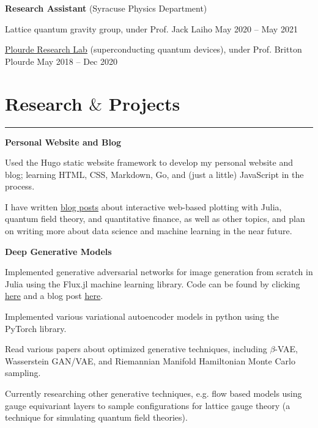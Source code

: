 \documentclass[9pt]{extarticle}
\newcommand{\myline}{\rule[\baselineskip]{\linewidth}{1pt}}
\begin{document}
\vspace{2.5pt}
\large\textbf{Research Assistant} \normalsize (Syracuse Physics Department)
\normalsize

\begin{compactitem}
\item Lattice quantum gravity group, under Prof. Jack Laiho \hfill \small May 2020 -- May 2021 
\normalsize
\item \href{https://bplourde.expressions.syr.edu/}{\underline{Plourde Research Lab}} (superconducting quantum devices), under Prof. Britton Plourde \hfill \small May 2018 -- Dec 2020
\end{compactitem}




\section{Research $\&$ Projects}

\myline

\large\textbf{Personal Website and Blog}
\normalsize

\begin{compactitem}
\item Used the Hugo static website framework to develop my personal website and blog; learning HTML, CSS, Markdown, Go, and (just a little) JavaScript in the process. 
\item I have written \href{https://aarontrowbridge.github.io/posts/}{\underline{blog posts}} about interactive web-based plotting with Julia, quantum field theory, and quantitative finance, as well as other topics, and plan on writing more about data science and machine learning in the near future. 
\end{compactitem}

\vspace{2.5pt}
\large\textbf{Deep Generative Models}
\normalsize

\begin{compactitem}
\item Implemented generative adversarial networks for image generation from scratch in Julia using the Flux.jl machine learning library. Code can be found by clicking \href{https://github.com/aarontrowbridge/FluxGAN.jl}{\underline{here}} and a blog post \href{https://aarontrowbridge.github.io/posts/generative-adversarial-nets/}{\underline{here}}.
\item Implemented various variational autoencoder models in python using the PyTorch library. 
\item Read various papers about optimized generative techniques, including $\beta$-VAE, Wasserstein GAN/VAE, and Riemannian Manifold Hamiltonian Monte Carlo sampling. 
\item Currently researching other generative techniques, e.g. flow based models using gauge equivariant layers to sample configurations for lattice gauge theory (a technique for simulating quantum field theories).
\end{compactitem}
\end{document}
